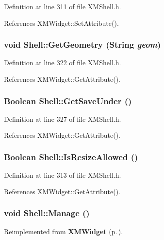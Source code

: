 Definition at line 311 of file XMShell.h.

References XMWidget::Set\-Attribute().
\subsubsection{\setlength{\rightskip}{0pt plus 5cm}void Shell::Get\-Geometry (String {\em geom})\hspace{0.3cm}{\tt  [inline]}}\label{classShell_a5}




Definition at line 322 of file XMShell.h.

References XMWidget::Get\-Attribute().
\subsubsection{\setlength{\rightskip}{0pt plus 5cm}Boolean Shell::Get\-Save\-Under ()\hspace{0.3cm}{\tt  [inline]}}\label{classShell_a7}




Definition at line 327 of file XMShell.h.

References XMWidget::Get\-Attribute().
\subsubsection{\setlength{\rightskip}{0pt plus 5cm}Boolean Shell::Is\-Resize\-Allowed ()\hspace{0.3cm}{\tt  [inline]}}\label{classShell_a3}




Definition at line 313 of file XMShell.h.

References XMWidget::Get\-Attribute().
\subsubsection{\setlength{\rightskip}{0pt plus 5cm}void Shell::Manage ()\hspace{0.3cm}{\tt  [inline]}}\label{classShell_a9}




Reimplemented from {\bf XMWidget} {\rm (p.\,\pageref{classXMWidget_a16})}.

